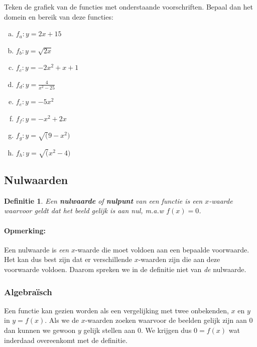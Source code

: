 \documentclass[12pt,a4paper,twoside]{article}
\newtheorem{definition}{Definitie}
\begin{document}
\begin{oefening}
  Teken de grafiek van de functies met onderstaande voorschriften. Bepaal dan het domein en bereik van deze functies:
  \begin{enumerate}[(a)]
    \itemsep0.8em
  \item $\displaystyle f_a : y=2x+15$
  \item $\displaystyle f_b : y=\sqrt{2x}$
  \item $\displaystyle f_c : y=-2x^2+x+1$
  \item $\displaystyle f_d : y=\frac{4}{x^2-25}$
  \item $\displaystyle f_e : y=-5x^2$
  \item $\displaystyle f_f : y=-x^2+2x$
  \item $\displaystyle f_g : y=\sqrt(9-x^2)$
  \item $\displaystyle f_h : y=\sqrt(x^2-4)$
  \end{enumerate}
\end{oefening}

\subsection{Nulwaarden}

\begin{definition}
  Een {\bf nulwaarde} of {\bf nulpunt} van een functie is een $x$-waarde waarvoor geldt dat het beeld gelijk is aan nul, m.a.w $f(x)=0$.
\end{definition}

\paragraph*{Opmerking:} Een nulwaarde is {\em een} $x$-waarde die moet voldoen aan een bepaalde voorwaarde. Het kan dus best zijn dat er verschillende $x$-waarden zijn die aan deze voorwaarde voldoen. Daarom spreken we in de definitie niet van {\em de} nulwaarde.

\subsubsection*{Algebraïsch}

Een functie kan gezien worden als een vergelijking met twee onbekenden, $x$ en $y$ in $y=f(x)$. Als we de $x$-waarden zoeken waarvoor de beelden gelijk zijn aan $0$ dan kunnen we gewoon $y$ gelijk stellen aan $0$. We krijgen dus $0=f(x)$ wat inderdaad overeenkomt met de definitie.
\end{document}
